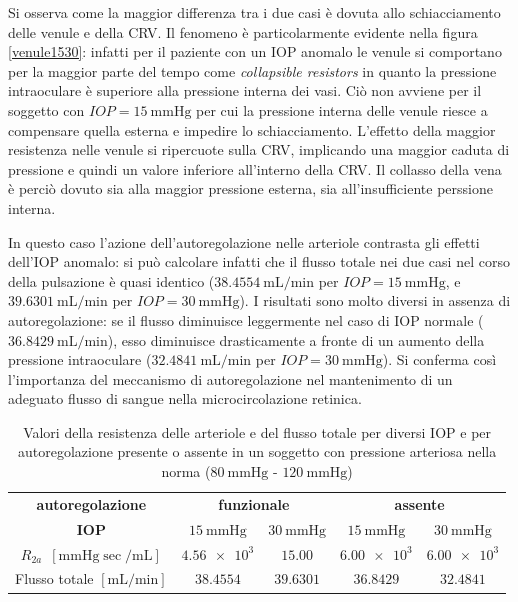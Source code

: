 \documentclass{article}
\begin{document}
Si osserva come la maggior differenza tra i due casi è dovuta allo schiacciamento delle venule e della CRV.
Il fenomeno è particolarmente evidente nella figura \ref{venule1530}: infatti per il paziente con un IOP anomalo le venule si comportano per la maggior parte del tempo come \textit{collapsible resistors} in quanto la pressione intraoculare è superiore alla pressione interna dei vasi.
Ciò non avviene per il soggetto con $IOP = \SI{15}{\mmHg}$ per cui la pressione interna delle venule riesce a compensare quella esterna e impedire lo schiacciamento.
L'effetto della maggior resistenza nelle venule si ripercuote sulla CRV, implicando una maggior caduta di pressione e quindi un valore inferiore all'interno della CRV.
Il collasso della vena è perciò dovuto sia alla maggior pressione esterna, sia all'insufficiente perssione interna.

In questo caso l'azione dell'autoregolazione nelle arteriole contrasta gli effetti dell'IOP anomalo: si può calcolare infatti che il flusso totale nei due casi nel corso della pulsazione è quasi identico ($\SI{38.4554}{\milli \liter \per \minute}$ per $IOP = \SI{15}{\mmHg}$, e $\SI{39.6301}{\milli \liter \per \minute}$ per $IOP = \SI{30}{\mmHg}$).
I risultati sono molto diversi in assenza di autoregolazione: se il flusso diminuisce leggermente nel caso di IOP normale ($\SI{36.8429}{\milli \liter \per \minute}$), esso diminuisce drasticamente a fronte di un aumento della pressione intraoculare ($\SI{32.4841}{\milli \liter \per \minute}$ per $IOP = \SI{30}{\mmHg}$).
Si conferma così l'importanza del meccanismo di autoregolazione nel mantenimento di un adeguato flusso di sangue nella microcircolazione retinica.
\FloatBarrier
\begin{table}[h!]
\begin{tabular}{|c|cc|cc|}
\hline
 \textbf{autoregolazione}& \multicolumn{2}{c|}{\textbf{funzionale}} & \multicolumn{2}{c|}{\textbf{assente}} \\
 \textbf{IOP}& $\SI{15}{\mmHg}$ & $\SI{30}{\mmHg}$ & $\SI{15}{\mmHg}$ & $\SI{30}{\mmHg}$ \\
 \hline
$R_{2a}$\ $[\si{\mmHg \sec \per \milli \liter}]$ &$\num{4.56e3}$ &$\num{15.00}$ &$ \num{6.00e3}$&$ \num{6.00e3}$ \\
 Flusso totale $[\si{\milli \liter \per \minute}]$&$38.4554$&$39.6301$ &$36.8429$&$32.4841$\\
 \hline
\end{tabular}
\caption{Valori della resistenza delle arteriole e del flusso totale per diversi IOP e per autoregolazione presente o assente in un soggetto con pressione arteriosa nella norma ($\SI{80}{\mmHg}$ - $\SI{120}{\mmHg}$)}
\label{riassunto_res1}
\end{table}
\end{document}
